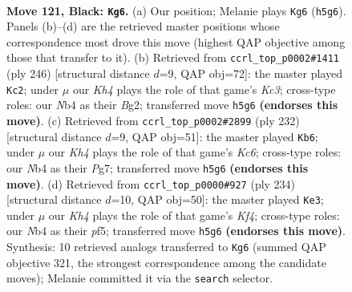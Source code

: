 \documentclass[11pt]{article}
\begin{document}
\clearpage

\begin{figure}[p]\centering
\begin{subfigure}{0.46\textwidth}\centering
\resizebox{\linewidth}{!}{%
\newchessgame
\chessboard[
  setfen={8/8/8/6pk/1n6/6K1/4B3/8 b - - 0 121},
  showmover=false,
  pgfstyle=straightmove, color=movearrow, markmove={h5-g6}
]}
\caption{}
\end{subfigure}\hfill
\begin{subfigure}{0.46\textwidth}\centering
\resizebox{\linewidth}{!}{%
\newchessgame
\chessboard[
  setfen={8/8/1k3b2/8/1PP5/2K5/6B1/8 w - - 87 124},
  showmover=false,
  pgfstyle=straightmove, color=movearrow, markmove={c3-c2}
]}
\caption{}
\end{subfigure}
\\[4pt]
\begin{subfigure}{0.46\textwidth}\centering
\resizebox{\linewidth}{!}{%
\newchessgame
\chessboard[
  setfen={3k4/6P1/2KP4/8/b7/8/7B/8 w - - 17 117},
  showmover=false,
  pgfstyle=straightmove, color=movearrow, markmove={c6-b6}
]}
\caption{}
\end{subfigure}\hfill
\begin{subfigure}{0.46\textwidth}\centering
\resizebox{\linewidth}{!}{%
\newchessgame
\chessboard[
  setfen={8/4k3/8/4Pp2/5K2/8/B6b/8 w - - 9 118},
  showmover=false,
  pgfstyle=straightmove, color=movearrow, markmove={f4-e3}
]}
\caption{}
\end{subfigure}
\caption{\textbf{Move 121, Black: \texttt{Kg6}.} (a) Our position; Melanie plays \texttt{Kg6} (\texttt{h5g6}). Panels (b)--(d) are the retrieved master positions whose correspondence most drove this move (highest QAP objective among those that transfer to it). (b) Retrieved from \texttt{ccrl\_top\_p0002\#1411} (ply 246) [structural distance $d$=9, QAP obj=72]: the master played \texttt{Kc2}; under $\mu$ our \emph{Kh4} plays the role of that game's \emph{Kc3}; cross-type roles: our \emph{N}b4 as their \emph{B}g2; transferred move \texttt{h5g6} \textbf{(endorses this move)}. (c) Retrieved from \texttt{ccrl\_top\_p0002\#2899} (ply 232) [structural distance $d$=9, QAP obj=51]: the master played \texttt{Kb6}; under $\mu$ our \emph{Kh4} plays the role of that game's \emph{Kc6}; cross-type roles: our \emph{N}b4 as their \emph{P}g7; transferred move \texttt{h5g6} \textbf{(endorses this move)}. (d) Retrieved from \texttt{ccrl\_top\_p0000\#927} (ply 234) [structural distance $d$=10, QAP obj=50]: the master played \texttt{Ke3}; under $\mu$ our \emph{Kh4} plays the role of that game's \emph{Kf4}; cross-type roles: our \emph{N}b4 as their \emph{p}f5; transferred move \texttt{h5g6} \textbf{(endorses this move)}. Synthesis: 10 retrieved analogs transferred to \texttt{Kg6} (summed QAP objective 321, the strongest correspondence among the candidate moves); Melanie committed it via the \texttt{search} selector.}
\label{fig:thought-m241}
\end{figure}
\end{document}

